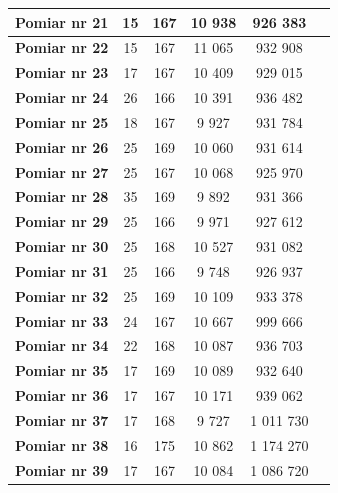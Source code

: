 \documentclass[11pt,a4paper]{article}
\begin{document}
\begin{table}[htbp]
\begin{center}
\begin{tabular}{|c|c|c|c|c|c|}
\textbf{Pomiar nr 21} & 15 & 167 & 10 938 & 926 383 &  \\ \hline
\textbf{Pomiar nr 22} & 15 & 167 & 11 065 & 932 908 &  \\ \hline
\textbf{Pomiar nr 23} & 17 & 167 & 10 409 & 929 015 &  \\ \hline
\textbf{Pomiar nr 24} & 26 & 166 & 10 391 & 936 482 &  \\ \hline
\textbf{Pomiar nr 25} & 18 & 167 & 9 927 & 931 784 &  \\ \hline
\textbf{Pomiar nr 26} & 25 & 169 & 10 060 & 931 614 &  \\ \hline
\textbf{Pomiar nr 27} & 25 & 167 & 10 068 & 925 970 &  \\ \hline
\textbf{Pomiar nr 28} & 35 & 169 & 9 892 & 931 366 &  \\ \hline
\textbf{Pomiar nr 29} & 25 & 166 & 9 971 & 927 612 &  \\ \hline
\textbf{Pomiar nr 30} & 25 & 168 & 10 527 & 931 082 &  \\ \hline
\textbf{Pomiar nr 31} & 25 & 166 & 9 748 & 926 937 &  \\ \hline
\textbf{Pomiar nr 32} & 25 & 169 & 10 109 & 933 378 &  \\ \hline
\textbf{Pomiar nr 33} & 24 & 167 & 10 667 & 999 666 &  \\ \hline
\textbf{Pomiar nr 34} & 22 & 168 & 10 087 & 936 703 &  \\ \hline
\textbf{Pomiar nr 35} & 17 & 169 & 10 089 & 932 640 &  \\ \hline
\textbf{Pomiar nr 36} & 17 & 167 & 10 171 & 939 062 &  \\ \hline
\textbf{Pomiar nr 37} & 17 & 168 & 9 727 & 1 011 730 &  \\ \hline
\textbf{Pomiar nr 38} & 16 & 175 & 10 862 & 1 174 270 &  \\ \hline
\textbf{Pomiar nr 39} & 17 & 167 & 10 084 & 1 086 720 &  \\ \hline
\end{tabular}
\end{center}
\label{bfs1}
\end{table}
\end{document}
